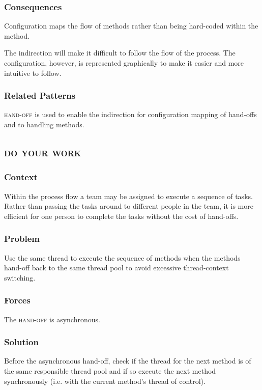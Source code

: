 \documentclass[prodmode]{style/acmlarge}
\begin{document}
\subsubsection*{Consequences} Configuration maps the flow of methods rather than
being hard-coded within the method.

The indirection will make it difficult to follow the flow of the process.  The
configuration, however, is represented graphically to make it easier and more
intuitive to follow.

\subsubsection*{Related Patterns} \textsc{hand-off} is used to enable the
indirection for configuration mapping of hand-offs and to handling methods.




\subsection{\textsc{\textbf{do your work}}}

\subsubsection*{Context} Within the process flow a team may be assigned to
execute a sequence of tasks. Rather than passing the tasks around to different
people in the team, it is more efficient for one person to complete the tasks
without the cost of hand-offs.

\subsubsection*{Problem} Use the same thread to execute the sequence of methods
when the methods hand-off back to the same thread pool to avoid excessive
thread-context switching.

\subsubsection*{Forces} The \textsc{hand-off} is asynchronous.

\subsubsection*{Solution} Before the asynchronous hand-off, check if the thread
for the next method is of the same responsible thread pool and if so execute the
next method synchronously (i.e. with the current method's thread of control).
\end{document}
